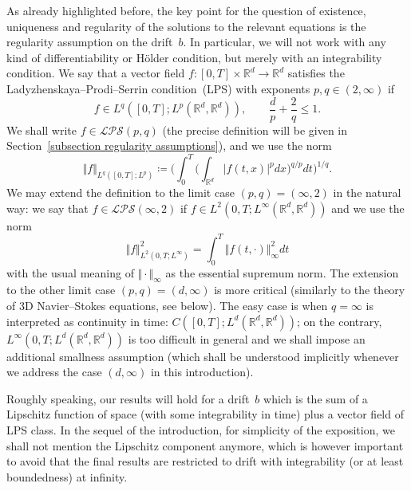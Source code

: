 \documentclass[a4paper,10pt]{article}
\newcommand\1{\mathbbm{1}}
\numberwithin{equation}{section}
\begin{document}
As already highlighted before, the key point for the question of existence, uniqueness and regularity of the solutions to the relevant equations is the regularity assumption on the drift~$b$. In particular, we will not work with any kind of differentiability or H\"{o}lder condition, but merely with an integrability condition. 
We say that a vector field $f \colon [ 0,T] \times\mathbb{R}^{d}\rightarrow\mathbb{R}^{d}$ satisfies the Ladyzhenskaya--Prodi--Serrin condition~(LPS) with exponents $p,q\in(2,\infty)$ if
\begin{equation*}
f\in L^{q}([0,T];L^{p}(\mathbb{R}^{d},\mathbb{R}^{d})),\qquad\frac{d}{p}+\frac{2}{q}\leq1.
\end{equation*}
We shall write $f\in\mathcal{LPS}(p,q)$ (the precise definition will be given in Section~\ref{subsection regularity assumptions}), and we use the norm
\begin{equation*}
\Vert f \Vert_{L^{q}([0,T];L^{p})} \coloneqq \bigg(\int_{0}^{T}\Big(\int_{\mathbb{R}^{d}} \vert f(t,x)
\vert^{p} dx \Big)^{q/p} dt \bigg)^{1/q}.
\end{equation*}
We may extend the definition to the limit case $(p,q) =(\infty,2)$ in the natural way: we say that $f\in\mathcal{LPS}(\infty,2)$ if $f\in L^{2}(0,T;L^{\infty}(\mathbb{R}^{d}, \mathbb{R}^{d}) )$ and we use the norm 
\begin{equation*}
\Vert f \Vert_{L^{2}(0,T;L^{\infty})
}^{2}= \int_{0}^{T} \Vert f(t,\cdot) \Vert_{\infty}^{2}dt
\end{equation*}
with the usual meaning of $\Vert \cdot \Vert _{\infty}$ as the essential supremum norm. The extension to the other limit case $(p,q) =(d,\infty)$ is more critical (similarly to the theory of 3D Navier--Stokes equations, see below). The easy case is when $q=\infty$ is interpreted as continuity in time: $C([0,T];L^{d}(\mathbb{R}^{d},\mathbb{R}^{d}))$; on the contrary, $L^{\infty}(0,T;L^{d}(\mathbb{R}^{d},\mathbb{R}^{d}) )$ is too difficult in general and we shall impose an additional smallness assumption (which shall be understood implicitly whenever we address the case $(d,\infty)$ in this introduction).

Roughly speaking, our results will hold for a drift~$b$ which is the sum of a Lipschitz function of space (with some integrability in time) plus a vector field of LPS class. In the sequel of the introduction, for simplicity of the exposition, we shall not mention the Lipschitz component anymore, which is however important to avoid that the final results are restricted to drift with integrability (or at least boundedness) at infinity.
\end{document}

